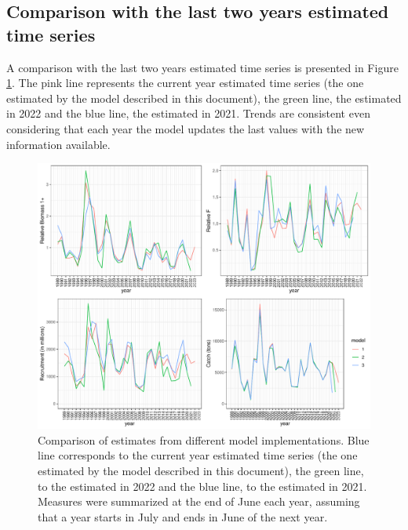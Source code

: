 \documentclass[review]{elsarticle}
\begin{document}
\subsection{Comparison with the last two years estimated time series}

A comparison with the last two years estimated time series is presented in Figure \ref{modelcomp}. The pink line represents the current year estimated time series (the one estimated by the model described in this document), the green line, the estimated in 2022 and the blue line, the estimated in 2021. Trends are consistent even considering that each year the model updates the last values with the new information available. %

\begin{figure}[h!]
 \centering
 \includegraphics{./ICESplots_modelcomp.pdf}
 \caption{Comparison of estimates from different model implementations. Blue line corresponds to the current year estimated time series (the one estimated by the model described in this document), the green line, to the estimated in 2022 and the blue line, to the estimated in 2021. Measures were summarized at the end of June each year, assuming that a year starts in July and ends in June of the next year.}
 \label{modelcomp}
\end{figure}
% 
\end{document}
